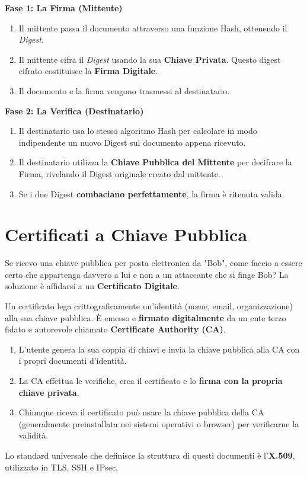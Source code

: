 \begin{exbox}
\textbf{Fase 1: La Firma (Mittente)}
\begin{enumerate}
    \item Il mittente passa il documento attraverso una funzione Hash, ottenendo il \textit{Digest}.
    \item Il mittente cifra il \textit{Digest} usando la sua \textbf{Chiave Privata}. Questo digest cifrato costituisce la \textbf{Firma Digitale}.
    \item Il documento e la firma vengono trasmessi al destinatario.
\end{enumerate}

\textbf{Fase 2: La Verifica (Destinatario)}
\begin{enumerate}
    \item Il destinatario usa lo stesso algoritmo Hash per calcolare in modo indipendente un nuovo Digest sul documento appena ricevuto.
    \item Il destinatario utilizza la \textbf{Chiave Pubblica del Mittente} per decifrare la Firma, rivelando il Digest originale creato dal mittente.
    \item Se i due Digest \textbf{combaciano perfettamente}, la firma è ritenuta valida.
\end{enumerate}
\end{exbox}

\section{Certificati a Chiave Pubblica}
Se ricevo una chiave pubblica per posta elettronica da "Bob", come faccio a essere certo che appartenga davvero a lui e non a un attaccante che si finge Bob? La soluzione è affidarsi a un \textbf{Certificato Digitale}.

Un certificato lega crittograficamente un'identità (nome, email, organizzazione) alla sua chiave pubblica. È emesso e \textbf{firmato digitalmente} da un ente terzo fidato e autorevole chiamato \textbf{Certificate Authority (CA)}.

\begin{enumerate}
    \item L'utente genera la sua coppia di chiavi e invia la chiave pubblica alla CA con i propri documenti d'identità.
    \item La CA effettua le verifiche, crea il certificato e lo \textbf{firma con la propria chiave privata}.
    \item Chiunque riceva il certificato può usare la chiave pubblica della CA (generalmente preinstallata nei sistemi operativi o browser) per verificarne la validità.
\end{enumerate}
Lo standard universale che definisce la struttura di questi documenti è l'\textbf{X.509}, utilizzato in TLS, SSH e IPsec.